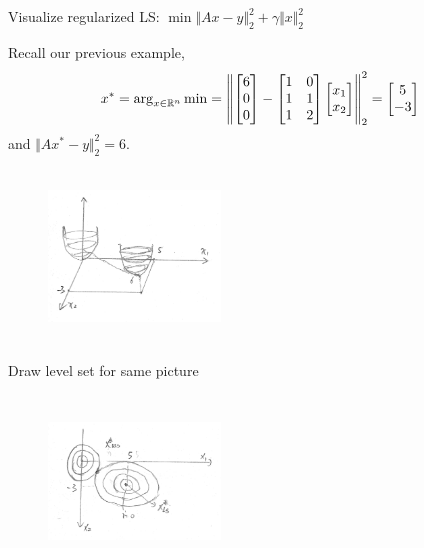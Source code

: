\vspace{0.8cm}
Visualize regularized LS: $\min \Vert Ax-y\Vert_2^2 +\gamma \Vert x\Vert^2_2$

Recall our previous example, 
$$x^*= \arg_{x\in \mathbb{R}^n} \min =
\left\Vert
\begin{bmatrix}
6\\
0\\
0
\end{bmatrix}
-
\begin{bmatrix}
1&0\\
1&1\\
1&2
\end{bmatrix}
\begin{bmatrix}
x_1\\
x_2
\end{bmatrix}
\right\Vert^2_2
=
\begin{bmatrix}
5\\
-3
\end{bmatrix}
$$
and $\Vert Ax^*-y\Vert_2^2 = 6$.


\begin{figure}
	\centering
	\includegraphics[width=1.8in,height=1.8in]{figures/ch06/ch06-06.jpg}
\end{figure}

\newpage
Draw level set for same picture
\begin{figure}
	\centering
	\includegraphics[width=1.8in,height=1.8in]{figures/ch06/ch06-07.jpg}
\end{figure}

